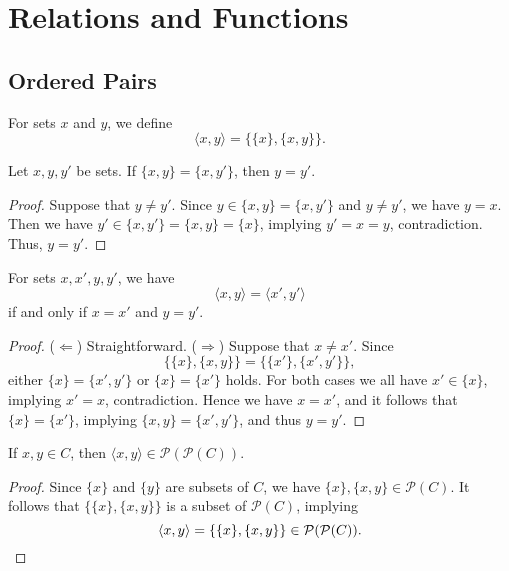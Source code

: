 \chapter{Relations and Functions}
\section{Ordered Pairs}
\begin{definition}
  For sets $x$ and $y$, we define
  \begin{equation*}
    \langle x, y \rangle = \{\{x\}, \{x, y\}\}.
  \end{equation*}
\end{definition}

\begin{lemma}
  Let $x, y, y'$ be sets.
  If $\{x, y\} = \{x, y'\}$, then $y = y'$.
\end{lemma}
\begin{proof}
  Suppose that $y \neq y'$.
  Since $y \in \{x, y\} = \{x, y'\}$ and $y \neq y'$, we have $y = x$.
  Then we have $y' \in \{x, y'\} = \{x, y\} = \{x\}$, implying $y' = x = y$,
  contradiction.
  Thus, $y = y'$.
\end{proof}

\begin{theorem}
  For sets $x, x', y, y'$, we have
  \begin{equation*}
    \langle x, y \rangle = \langle x', y' \rangle
  \end{equation*}
  if and only if $x = x'$ and $y = y'$.
\end{theorem}
\begin{proof}
  ($\Leftarrow$)
  Straightforward.
  ($\Rightarrow$)
  Suppose that $x \neq x'$.
  Since
  \begin{equation*}
    \{\{x\}, \{x, y\}\} = \{\{x'\}, \{x', y'\}\},
  \end{equation*}
  either $\{x\} = \{x', y'\}$ or $\{x\} = \{x'\}$ holds.
  For both cases we all have $x' \in \{x\}$, implying $x' = x$, contradiction.
  Hence we have $x = x'$, and it follows that $\{x\} = \{x'\}$, implying
  $\{x, y\} = \{x', y'\}$, and thus $y = y'$.
\end{proof}

\begin{lemma}
  If $x, y \in C$, then $\langle x, y \rangle \in \mathcal{P}(\mathcal{P}(C))$.
\end{lemma}
\begin{proof}
  Since $\{x\}$ and $\{y\}$ are subsets of $C$, we have
  $\{x\}, \{x, y\} \in \mathcal{P}(C)$.
  It follows that $\{\{x\}, \{x, y\}\}$ is a subset of $\mathcal{P}(C)$,
  implying
  \begin{equation*}
    \langle x, y \rangle = \{\{x\}, \{x, y\}\} \in \mathcal{P}(\mathcal{P}(C)).
    \qedhere
  \end{equation*}
\end{proof}

